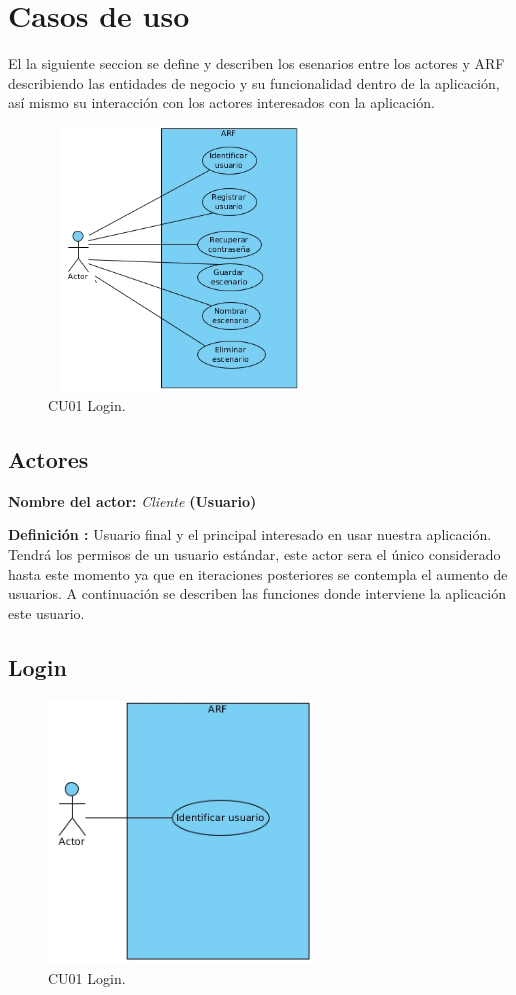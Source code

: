 \section{Casos de uso}
El la siguiente seccion se define y describen los esenarios entre los actores y ARF describiendo las entidades de negocio y su funcionalidad dentro de la aplicación, así mismo su interacción con los actores interesados con la aplicación.\par
\vspace{5mm} 	
\begin{figure}[h!]
	\centering
	\includegraphics[width=7cm,height=7cm]{imagenes/analisis/casosDeUso.jpg}
	\caption{CU01 Login.\cite{B27}}
	\label{fig:analogo}
\end{figure}  
\newpage

\subsection{Actores}
\textbf{Nombre del actor:} \textit{Cliente} \textbf{(Usuario)}\par
\textbf{Definición :} Usuario final y el principal interesado en usar nuestra aplicación. Tendrá los permisos de un usuario estándar, este actor sera el único considerado hasta este momento ya que en iteraciones posteriores se contempla el aumento de usuarios. A continuación se describen las funciones donde interviene la aplicación este usuario.

\subsection{Login}
\begin{figure}[h!]
	\centering
	\includegraphics[width=7cm,height=7cm]{imagenes/analisis/login.jpg}
	\caption{CU01 Login.\cite{B27}}
	\label{fig:analogo}
\end{figure}  

